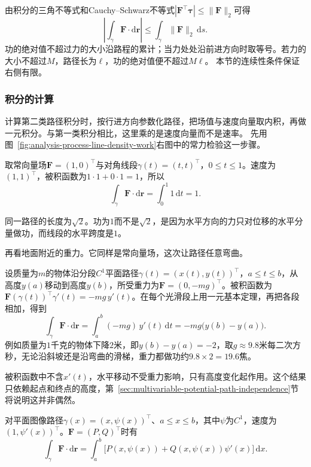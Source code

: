 由积分的三角不等式和Cauchy--Schwarz不等式$|\bm F^\top\bm\tau|\leq\lVert\bm F\rVert_2$可得
\[
 \left|\int_\gamma\bm F\cdot\mathrm d\bm r\right|
 \leq\int_\gamma\lVert\bm F\rVert_2\,\mathrm ds.
\]
功的绝对值不超过力的大小沿路程的累计；当力处处沿前进方向时取等号。若力的大小不超过$M$，路径长为$\ell$，功的绝对值便不超过$M\ell$。
本节的连续性条件保证右侧有限。

\subsubsection{积分的计算}

计算第二类路径积分时，按行进方向参数化路径，把场值与速度向量取内积，再做一元积分。与第一类积分相比，这里乘的是速度向量而不是速率。
先用图~\ref{fig:analysis-process-line-density-work}右图中的常力检验这一步骤。
\begin{example}[常力沿对角线段做功]
取常向量场$\bm F=(1,0)^\top$与对角线段$\gamma(t)=(t,t)^\top$，$0\leq t\leq1$。速度为$(1,1)^\top$，被积函数为$1\cdot1+0\cdot1=1$，所以
\[
 \int_\gamma\bm F\cdot\mathrm d\bm r=\int_0^1 1\,\mathrm dt=1.
\]
\end{example}
同一路径的长度为$\sqrt2$。功为$1$而不是$\sqrt2$，是因为水平方向的力只对位移的水平分量做功，而线段的水平跨度是$1$。

再看地面附近的重力。它同样是常向量场，这次让路径任意弯曲。
\begin{example}[重力做功只取决于高度差]
\label{ex:analysis-gravity-work}
设质量为$m$的物体沿分段$C^1$平面路径$\gamma(t)=(x(t),y(t))^\top$，$a\leq t\leq b$，从高度$y(a)$移动到高度$y(b)$，所受重力为$\bm F=(0,-mg)^\top$。被积函数为$\bm F(\gamma(t))^\top\gamma'(t)=-mg\,y'(t)$。在每个光滑段上用一元基本定理，再把各段相加，得到
\[
 \int_\gamma\bm F\cdot\mathrm d\bm r
 =\int_a^b(-mg)\,y'(t)\,\mathrm dt=-mg\bigl(y(b)-y(a)\bigr).
\]
例如质量为$1$千克的物体下降$2$米，即$y(b)-y(a)=-2$，取$g\approx9.8$米每二次方秒，无论沿斜坡还是沿弯曲的滑梯，重力都做功约$9.8\times2=19.6$焦。
\end{example}
被积函数中不含$x'(t)$，水平移动不受重力影响，只有高度变化起作用。这个结果只依赖起点和终点的高度，第~\ref{sec:multivariable-potential-path-independence}节将说明这并非偶然。

对平面图像路径$\gamma(x)=(x,\psi(x))^\top$、$a\leq x\leq b$，其中$\psi$为$C^1$，速度为$(1,\psi'(x))^\top$。$\bm F=(P,Q)^\top$时有
\[
 \int_\gamma\bm F\cdot\mathrm d\bm r
 =\int_a^b\bigl[P(x,\psi(x))+Q(x,\psi(x))\psi'(x)\bigr]\,\mathrm dx.
\]

